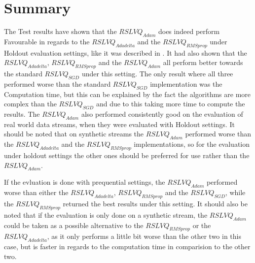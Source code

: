 \documentclass[12pt,oneside,a4paper,parskip]{scrbook}
\begin{document}
\chapter{Summary}
The Test results have shown that the $RSLVQ_\textit{Adam}$ does indeed perform Favourable in regards to the $RSLVQ_\textit{Adadelta}$ and the
$RSLVQ_\textit{RMSprop}$ under Holdout evaluation settings, like it was described in \cite{Kingma2014AdamAM}.
It had also shown that the $RSLVQ_\textit{Adadelta}$, $RSLVQ_\textit{RMSprop}$ and the $RSLVQ_\textit{Adam}$ all perform better
towards the standard $RSLVQ_\textit{SGD}$ under this setting.
The only result where all three performed worse than the standard $RSLVQ_\textit{SGD}$ implementation was the Computation time,
but this can be explained by the fact the algorithms are more complex than the $RSLVQ_\textit{SGD}$ and due to this taking more time
to compute the results.
The $RSLVQ_\textit{Adam}$ also performed consistently good on the evaluation of real world data streams, when they were evaluated with 
Holdout settings.
It should be noted that on synthetic streams the $RSLVQ_\textit{Adam}$ performed worse than the $RSLVQ_\textit{Adadelta}$ and the $RSLVQ_\textit{RMSprop}$
implementations, so for the evaluation under holdout settings the other ones should be preferred for use rather than the $RSLVQ_\textit{Adam}$.

If the evluation is done with prequential settings, the $RSLVQ_\textit{Adam}$ performed worse than either the
$RSLVQ_\textit{Adadelta}$, $RSLVQ_\textit{RMSprop}$ and the $RSLVQ_\textit{SGD}$, while the $RSLVQ_\textit{RMSprop}$ 
returned the best results under this setting.
It should also be noted that if the evaluation is only done on a synthetic stream, the $RSLVQ_\textit{Adam}$ could be taken as a 
possible alternative to the $RSLVQ_\textit{RMSprop}$ or the $RSLVQ_\textit{Adadelta}$, as it only performs a little bit worse than the other two in this case,
but is faster in regards to the computation time in comparision to the other two.

\backmatter

\printacronyms[include-classes=abbrev,name=Abbreviations]


\listoffigures
{}			

\listoftables
\end{document}
